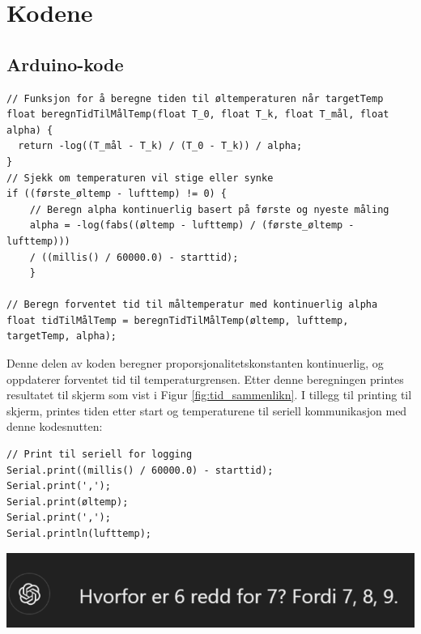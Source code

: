 \documentclass{article}
\begin{document}
\section{Kodene}
\subsection{Arduino-kode}
\begin{verbatim}
// Funksjon for å beregne tiden til øltemperaturen når targetTemp
float beregnTidTilMålTemp(float T_0, float T_k, float T_mål, float alpha) {
  return -log((T_mål - T_k) / (T_0 - T_k)) / alpha;
}
// Sjekk om temperaturen vil stige eller synke
if ((første_øltemp - lufttemp) != 0) {
    // Beregn alpha kontinuerlig basert på første og nyeste måling
    alpha = -log(fabs((øltemp - lufttemp) / (første_øltemp - lufttemp))) 
    / ((millis() / 60000.0) - starttid);
    }

// Beregn forventet tid til måltemperatur med kontinuerlig alpha
float tidTilMålTemp = beregnTidTilMålTemp(øltemp, lufttemp, targetTemp, alpha);

\end{verbatim}
Denne delen av koden beregner proporsjonalitetskonstanten kontinuerlig, og oppdaterer forventet tid til temperaturgrensen. Etter denne beregningen printes resultatet til skjerm som vist i Figur \ref{fig:tid_sammenlikn}.
I tillegg til printing til skjerm, printes tiden etter start og temperaturene til seriell kommunikasjon med denne kodesnutten:
\begin{verbatim}
// Print til seriell for logging
Serial.print((millis() / 60000.0) - starttid);
Serial.print(',');
Serial.print(øltemp);
Serial.print(',');
Serial.println(lufttemp);
\end{verbatim}
\vfill
\begin{center}
    \includegraphics{GPT_math_joke.png}
\end{center}
\end{document}
